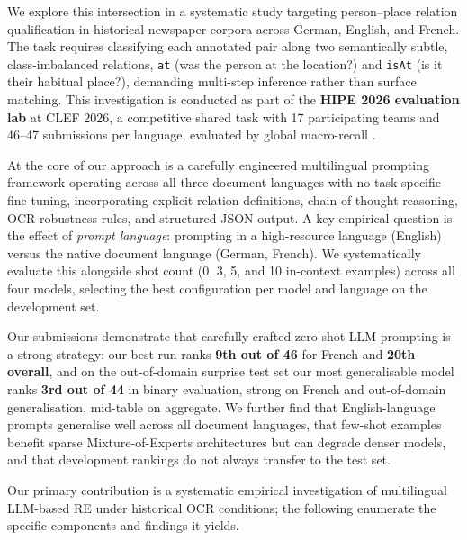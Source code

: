 \documentclass[
]{ceurart}
\theoremstyle{definition}
\begin{document}
We explore this intersection in a systematic study targeting person--place relation qualification in historical newspaper corpora across German, English, and French.
The task requires classifying each annotated pair along two semantically subtle, class-imbalanced relations, \texttt{at} (was the person at the location?) and \texttt{isAt} (is it their habitual place?), demanding multi-step inference rather than surface matching.
This investigation is conducted as part of the \textbf{HIPE 2026 evaluation lab} at CLEF 2026, a competitive shared task with 17 participating teams and 46--47 submissions per language, evaluated by global macro-recall \citep{opitz_extended_2026, opitz_overview_2026}.

At the core of our approach is a carefully engineered multilingual prompting framework operating across all three document languages with no task-specific fine-tuning, incorporating explicit relation definitions, chain-of-thought reasoning, OCR-robustness rules, and structured JSON output.
A key empirical question is the effect of \emph{prompt language}: prompting in a high-resource language (English) versus the native document language (German, French).
We systematically evaluate this alongside shot count (0, 3, 5, and 10 in-context examples) across all four models, selecting the best configuration per model and language on the development set.

Our submissions demonstrate that carefully crafted zero-shot LLM prompting is a strong strategy: our best run ranks \textbf{9th out of 46} for French and \textbf{20th overall}, and on the out-of-domain surprise test set our most generalisable model ranks \textbf{3rd out of 44} in binary evaluation, strong on French and out-of-domain generalisation, mid-table on aggregate.
We further find that English-language prompts generalise well across all document languages, that few-shot examples benefit sparse Mixture-of-Experts architectures but can degrade denser models, and that development rankings do not always transfer to the test set.

Our primary contribution is a systematic empirical investigation of multilingual LLM-based RE under historical OCR conditions; the following enumerate the specific components and findings it yields.
\end{document}
